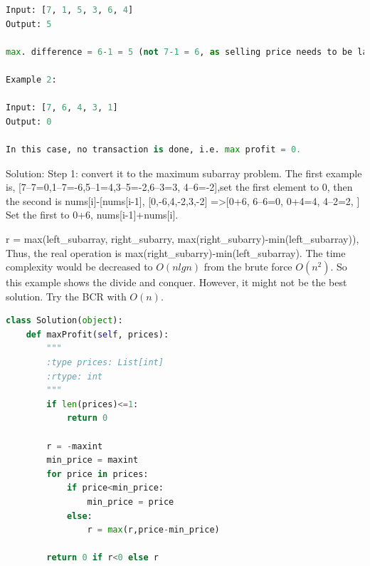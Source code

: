 \documentclass[../algorithms.tex]{subfiles}
\begin{document}
\begin{enumerate}
\begin{lstlisting}[language=Python]
Input: [7, 1, 5, 3, 6, 4]
Output: 5

max. difference = 6-1 = 5 (not 7-1 = 6, as selling price needs to be larger than buying price)

Example 2:

Input: [7, 6, 4, 3, 1]
Output: 0

In this case, no transaction is done, i.e. max profit = 0.
\end{lstlisting}

Solution: Step 1: convert it to the maximum subarray problem. The first example is, [7–7=0,1–7=-6,5–1=4,3–5=-2,6–3=3, 4–6=-2],set the first element to 0, then the second is nums[i]-[nums[i-1], [0,-6,4,-2,3,-2] =>[0+6, 6–6=0, 0+4=4, 4–2=2, ] Set the first to 0+6, nums[i-1]+nums[i].

r = max(left\_subarray, right\_subarry, max(right\_subarry)-min(left\_subarray)), Thus, the real operation is max(right\_subarry)-min(left\_subarray). The time complexity would be decreased to $O(nlgn)$ from the brute force $O(n^2)$. So this example shows the divide and conquer. However, it might not be the best solution. Try the BCR with $O(n)$.
\begin{lstlisting}[language=Python]
class Solution(object):
    def maxProfit(self, prices):
        """
        :type prices: List[int]
        :rtype: int
        """
        if len(prices)<=1:
            return 0
    
        r = -maxint
        min_price = maxint
        for price in prices:
            if price<min_price:
                min_price = price
            else:
                r = max(r,price-min_price)
            
        return 0 if r<0 else r
\end{lstlisting}
\end{enumerate}
\end{document}
